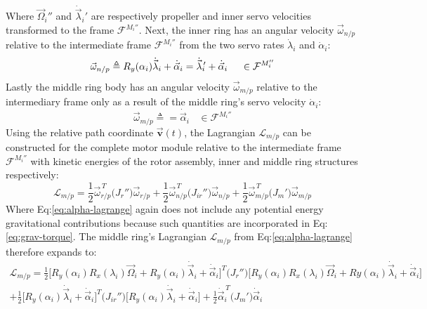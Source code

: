 Where $\vec{\Omega}_i''$ and $\dot{\vec{\lambda}}_i'$ are respectively propeller and inner servo velocities transformed to the frame $\mathcal{F}^{M_i''}$. Next, the inner ring has an angular velocity $\vec{\omega}_{n/p}$ relative to the intermediate frame $\mathcal{F}^{M_i''}$ from the two servo rates $\dot{\lambda}_i$ and $\dot{\alpha}_i$:
\begin{equation}\label{eq:inner-relative}
\vec{\omega}_{n/p}\triangleq R_y(\alpha_i)\dot{\vec{\lambda}}_i+\dot{\vec{\alpha}}_i=\dot{\vec{\lambda}}_i\text{}\hspace{-2pt}'+\dot{\vec{\alpha}}_i~~~~\in\mathcal{F}^{M_i''}
\end{equation}
Lastly the middle ring body has an angular velocity $\vec{\omega}_{m/p}$ relative to the intermediary frame only as a result of the middle ring's servo velocity $\dot{\alpha}_i$:
\begin{equation}\label{eq:middle-relative}
\vec{\omega}_{m/p}\triangleq=\dot{\vec{\alpha}}_i~~~~\in\mathcal{F}^{M_i''}
\end{equation}
Using the relative path coordinate $\vec{\mathbf{v}}(t)$, the Lagrangian $\mathcal{L}_{m/p}$ can be constructed for the complete motor module relative to the intermediate frame $\mathcal{F}^{M_i''}$ with kinetic energies of the rotor assembly, inner and middle ring structures respectively:
\begin{equation}\label{eq:alpha-lagrange}
\mathcal{L}_{m/p}=\frac{1}{2}\vec{\omega}_{r/p}^{\hspace{2pt}T}\big(J_{r}''\big)\vec{\omega}_{r/p}+\frac{1}{2}\vec{\omega}_{n/p}^{\hspace{2pt}T}\big(J_{ir}''\big)\vec{\omega}_{n/p}+\frac{1}{2}\vec{\omega}_{m/p}^{\hspace{2pt}T}\big(J_{m}'\big)\vec{\omega}_{m/p}
\end{equation}
Where Eq:\ref{eq:alpha-lagrange} again does not include any potential energy gravitational contributions because such quantities are incorporated in Eq:\ref{eq:grav-torque}. The middle ring's Lagrangian $\mathcal{L}_{m/p}$ from Eq:\ref{eq:alpha-lagrange} therefore expands to:
\begin{multline}\label{eq:alpha-lagrange-two}
\mathcal{L}_{m/p}=\frac{1}{2}\Big[R_y(\alpha_i)R_x(\lambda_i)\vec{\Omega}_i+R_y(\alpha_i)\dot{\vec{\lambda}}_i+\dot{\vec{\alpha}}_i\Big]^T\big(J_r''\big)\Big[R_y(\alpha_i)R_x(\lambda_i)\vec{\Omega}_i+Ry(\alpha_i)\dot{\vec{\lambda}}_i+\dot{\vec{\alpha}}_i\Big]\\
+\frac{1}{2}\Big[R_y(\alpha_i)\dot{\vec{\lambda}}_i+\dot{\vec{\alpha}}_i\Big]^T\big(J_{ir}''\big)\Big[R_y(\alpha_i)\dot{\vec{\lambda}}_i+\dot{\vec{\alpha}}_i\Big]
+\frac{1}{2}\dot{\vec{\alpha}}_i^{\hspace{2pt}T}\big(J_m'\big)\dot{\vec{\alpha}}_i
\end{multline}
